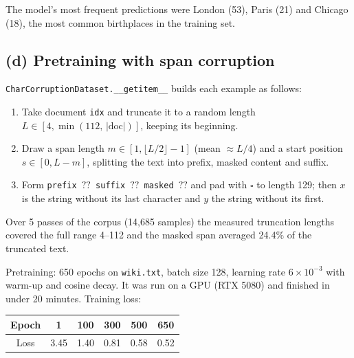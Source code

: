 \documentclass[11pt]{article}
\newcommand{\MASK}{\ensuremath{?\!?}}
\newcommand{\PAD}{\ensuremath{\square}}
\begin{document}
The model's most frequent predictions were London (53), Paris (21) and
Chicago (18), the most common birthplaces in the training set.


\subsection*{(d) Pretraining with span corruption}

\texttt{CharCorruptionDataset.\_\_getitem\_\_} builds each example as follows:
\begin{enumerate}
  \item Take document \texttt{idx} and truncate it to a random length
        $L\in[4,\min(112,\,|\text{doc}|)]$, keeping its beginning.
  \item Draw a span length $m\in[1,\lfloor L/2\rfloor-1]$ (mean $\approx L/4$)
        and a start position $s\in[0,L-m]$, splitting the text into
        prefix, masked content and suffix.
  \item Form \texttt{prefix \MASK{} suffix \MASK{} masked \MASK{}} and pad with \PAD{}
        to length 129; then $x$ is the string without its last character
        and $y$ the string without its first.
\end{enumerate}
Over 5 passes of the corpus (14{,}685 samples) the measured truncation lengths
covered the full range 4--112 and the masked span averaged 24.4\% of the
truncated text.

Pretraining: 650 epochs on \texttt{wiki.txt}, batch size 128, learning rate
$6\times10^{-3}$ with warm-up and cosine decay. It was run on a GPU
(RTX 5080) and finished in under 20 minutes. Training loss:

\begin{center}
\begin{tabular}{cccccc}
\toprule
Epoch & 1 & 100 & 300 & 500 & 650 \\
\midrule
Loss & 3.45 & 1.40 & 0.81 & 0.58 & 0.52 \\
\bottomrule
\end{tabular}
\end{center}

\end{document}
